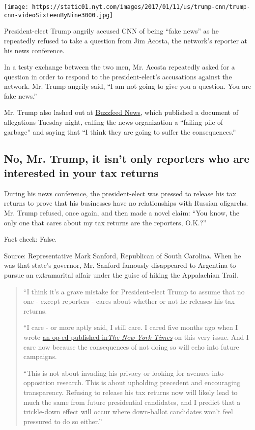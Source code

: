 \texttt{[image: https://static01.nyt.com/images/2017/01/11/us/trump-cnn/trump-cnn-videoSixteenByNine3000.jpg]}

President-elect Trump angrily accused CNN of being ``fake news'' as he
repeatedly refused to take a question from Jim Acosta, the network's
reporter at his news conference.

In a testy exchange between the two men, Mr. Acosta repeatedly asked for
a question in order to respond to the president-elect's accusations
against the network. Mr. Trump angrily said, ``I am not going to give
you a question. You are fake news.''

Mr. Trump also lashed out at
\href{https://www.buzzfeed.com/news}{Buzzfeed News}, which published a
document of allegations Tuesday night, calling the news organization a
``failing pile of garbage'' and saying that ``I think they are going to
suffer the consequences.''

\hypertarget{no-mr-trump-it-isnt-only-reporters-who-are-interested-in-your-tax-returns}{%
\subsection{No, Mr. Trump, it isn't only reporters who are interested in
your tax
returns}\label{no-mr-trump-it-isnt-only-reporters-who-are-interested-in-your-tax-returns}}

During his news conference, the president-elect was pressed to release
his tax returns to prove that his businesses have no relationships with
Russian oligarchs. Mr. Trump refused, once again, and then made a novel
claim: ``You know, the only one that cares about my tax returns are the
reporters, O.K.?''

Fact check: False.

Source: Representative Mark Sanford, Republican of South Carolina. When
he was that state's governor, Mr. Sanford famously disappeared to
Argentina to pursue an extramarital affair under the guise of hiking the
Appalachian Trail.

\begin{quote}
``I think it's a grave mistake for President-elect Trump to assume that
no one - except reporters - cares about whether or not he releases his
tax returns.

``I care - or more aptly said, I still care. I cared five months ago
when I wrote
\href{https://www.nytimes.com/2016/08/15/opinion/i-support-you-donald-trump-now-release-your-tax-returns.html}{an
op-ed published
in}\emph{\href{https://www.nytimes.com/2016/08/15/opinion/i-support-you-donald-trump-now-release-your-tax-returns.html}{The
New York Times}} on this very issue. And I care now because the
consequences of not doing so will echo into future campaigns.

``This is not about invading his privacy or looking for avenues into
opposition research. This is about upholding precedent and encouraging
transparency. Refusing to release his tax returns now will likely lead
to much the same from future presidential candidates, and I predict that
a trickle-down effect will occur where down-ballot candidates won't feel
pressured to do so either.''
\end{quote}

